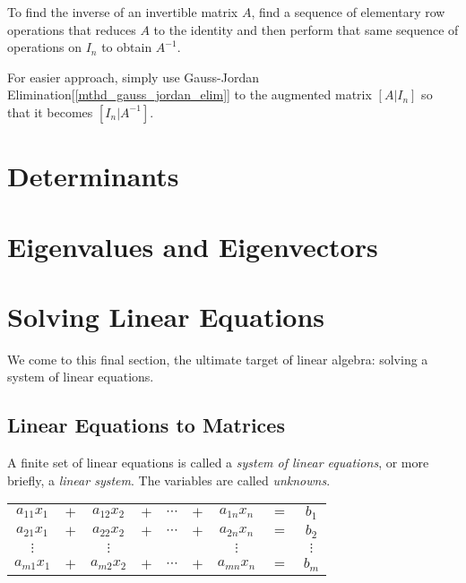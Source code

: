 \documentclass{report}
\begin{document}
		\begin{mthd}
			To find the inverse of an invertible matrix $A$, find a sequence of elementary row operations that reduces $A$ to the identity and then perform that same sequence of operations on $I_n$ to obtain $A^{-1}$.
			
			For easier approach, simply use Gauss-Jordan Elimination[\ref{mthd_gauss_jordan_elim}] to the augmented matrix $\left[A|I_n\right]$ so that it becomes $\left[I_n|A^{-1}\right]$.
		\end{mthd}
	
	\section{Determinants}
		\subsection{}
	
	\section{Eigenvalues and Eigenvectors}
		\subsection{}
	
	\section{Solving Linear Equations}
	We come to this final section, the ultimate target of linear algebra: solving a system of linear equations.
		\subsection{Linear Equations to Matrices}
		A finite set of linear equations is called a \emph{system of linear equations}, or more briefly, a \emph{linear system}. The variables are called \emph{unknowns}.
		
		\begin{center}
			\begin{tabular}{ccccccccc}
				$a_{11}x_1$ & $+$ & $a_{12}x_2$ & $+$ & $\cdots$ & $+$ & $a_{1n}x_n$ & $=$ & $b_1$    \\
				$a_{21}x_1$ & $+$ & $a_{22}x_2$ & $+$ & $\cdots$ & $+$ & $a_{2n}x_n$ & $=$ & $b_2$    \\
				$\vdots$    &     & $\vdots$   &     &          &     & $\vdots$    &     & $\vdots$ \\
				$a_{m1}x_1$ & $+$ & $a_{m2}x_2$ & $+$ & $\cdots$ & $+$ & $a_{mn}x_n$ & $=$ & $b_m$   
			\end{tabular}
		\end{center}
		
\end{document}
